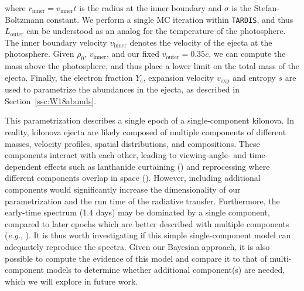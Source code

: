 \documentclass[twocolumn, twocolappendix]{aastex63}
\def\TARDIS{\texttt{TARDIS}}
\def\eg{{\it e.g.}}
\begin{document}
\noindent where $r_{\mathrm{inner}} = v_{\mathrm{inner}} t$ is the radius at the inner boundary and $\sigma$ is the Stefan-Boltzmann constant. We perform a single MC iteration within \TARDIS, and thus $L_{\mathrm{outer}}$ can be understood as an analog for the temperature of the photosphere. The inner boundary velocity $v_{\mathrm{inner}}$ denotes the velocity of the ejecta at the photosphere. Given $\rho_0$, $v_{\mathrm{inner}}$, and our fixed $v_{\mathrm{outer}} = 0.35c$, we can compute the mass above the photosphere, and thus place a lower limit on the total mass of the ejecta. Finally, the electron fraction $Y_e$, expansion velocity $v_{\mathrm{exp}}$ and entropy $s$ are used to parametrize the abundances in the ejecta, as described in Section~\ref{ssc:W18abunds}.


This parametrization describes a single epoch of a single-component kilonova. In reality, kilonova ejecta are likely composed of multiple components of different masses, velocity profiles, spatial distributions, and compositions. These components interact with each other, leading to viewing-angle- and time-dependent effects such as lanthanide curtaining (\citealt{kasen15, wollaeger18, darbha20, nativi21}) and reprocessing where different components overlap in space (\citealt{kawaguchi20, korobkin21}). However, including additional components would significantly increase the dimensionality of our parametrization and the run time of the radiative transfer. Furthermore, the early-time spectrum (1.4 days) may be dominated by a single component, compared to later epochs which are better described with multiple components (\eg, \citealt{kasen17}). It is thus worth investigating if this simple single-component model can adequately reproduce the spectra. Given our Bayesian approach, it is also possible to compute the evidence of this model and compare it to that of multi-component models to determine whether additional component(s) are needed, which we will explore in future work.
\end{document}
